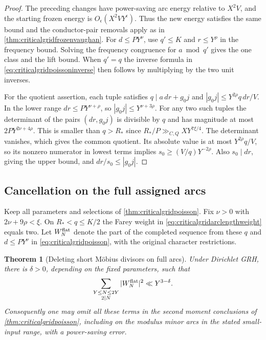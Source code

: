 \documentclass[11pt,a4paper]{article}
\numberwithin{equation}{section}
\newtheorem{theorem}{Theorem}[section]
\begin{document}
\begin{proof}
The preceding changes have power-saving arc energy
relative to $X^2 V$, and the starting frozen energy is
$O_\epsilon(X^2 VY^\epsilon)$. Thus the new energy
satisfies the same bound and the conductor-pair removals
apply as in \cref{thm:criticalgridfrozenvaughan}.
For $d\le P Y^\nu$, use $q'\le K$ and $r\le Y^\rho$
in the frequency bound. Solving the frequency congruence
for $a\bmod q'$ gives the one class and the lift bound.
When $q'=q$ the inverse formula in
\cref{eq:criticalgridpoissoninverse} then follows by
multiplying by the two unit inverses.

For the quotient assertion, each tuple satisfies
$q\mid a\,dr+g_0j$ and $|g_0j|\le Y^{2\rho}q\,dr/V$.
In the lower range $dr\le P Y^{\nu+\rho}$, so
$|g_0j|\le Y^{\nu+3\rho}$. For any two such tuples
the determinant of the pairs $(dr,g_0j)$ is divisible
by $q$ and has magnitude at most $2P Y^{2\nu+4\rho}$.
This is smaller than $q>R_*$ since
$R_*/P\gg_{C,Q} XY^{7\xi/4}$. The determinant vanishes,
which gives the common quotient. Its absolute value
is at most $Y^{2\rho}q/V$, so its nonzero numerator
in lowest terms implies $s_0\ge (V/q)Y^{-2\rho}$.
Also $s_0\mid dr$, giving the upper bound, and
$dr/s_0\le |g_0j|$.
\end{proof}

\clearpage
\subsection{Cancellation on the full assigned arcs}

Keep all parameters and selections of
\cref{thm:criticalgridpoisson}. Fix $\nu>0$ with
$2\nu+9\rho<\xi$.
On $R_*<q\le K/2$ the Farey weight in
\cref{eq:criticalgridarclengthweight} equals two.
Let $W_N^{\rm flat}$ denote the part of the completed
sequence from these $q$ and $d\le P Y^\nu$ in
\cref{eq:criticalgridpoisson}, with the original character
restrictions.

\begin{theorem}[Deleting short M\"obius divisors on full arcs]
\label{thm:criticalgridflatdeletion}
Under Dirichlet GRH, there is $\delta>0$, depending on the
fixed parameters, such that
\begin{equation}
 \sum_{\substack{Y\le N\le2Y\\2\mid N}}|W_N^{\rm flat}|^2
                \ll Y^{3-\delta}.
 \label{eq:criticalgridflatdeletion}
\end{equation}
Consequently one may omit all these terms in the second
moment conclusions of \cref{thm:criticalgridpoisson},
including on the modulus minor arcs in the stated
small-input range, with a power-saving error.
\end{theorem}
\end{document}
